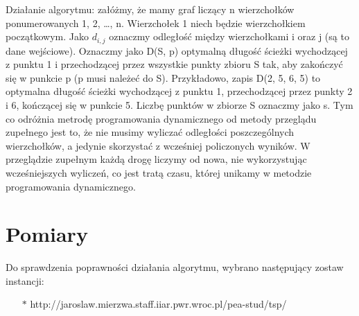 \documentclass[a4paper,12pt]{article}
\begin{document}
Działanie algorytmu: załóżmy, że mamy graf liczący n wierzchołków ponumerowanych 
1, 2, …, n. Wierzchołek 1 niech będzie wierzchołkiem początkowym. Jako $d_{i,j}$
oznaczmy odległość między wierzchołkami i oraz j (są to dane wejściowe). 
Oznaczmy jako D(S, p) optymalną długość ścieżki wychodzącej z punktu 1 i 
przechodzącej przez wszystkie punkty zbioru S tak, aby zakończyć się w punkcie p 
(p musi należeć do S). Przykładowo, zapis D({2, 5, 6}, 5) to optymalna długość 
ścieżki wychodzącej z punktu 1, przechodzącej przez punkty 2 i 6, kończącej się w 
punkcie 5. Liczbę punktów w zbiorze S oznaczmy jako s. Tym co odróżnia metrodę programowania
dynamicznego od metody przeglądu zupełnego jest to, że nie musimy wyliczać odległości
poszczególnych wierzchołków, a jedynie skorzystać z wcześniej policzonych wyników. 
W przeglądzie zupełnym każdą drogę liczymy od nowa, nie wykorzystując wcześniejszych 
wyliczeń, co jest tratą czasu, której unikamy w metodzie programowania dynamicznego.

\section{Pomiary}
Do sprawdzenia poprawności działania algorytmu, wybrano następujący zostaw instancji:
\begin{itemize}
    \item[$*$] http://jaroslaw.mierzwa.staff.iiar.pwr.wroc.pl/pea-stud/tsp/
\end{itemize}
\end{document}
